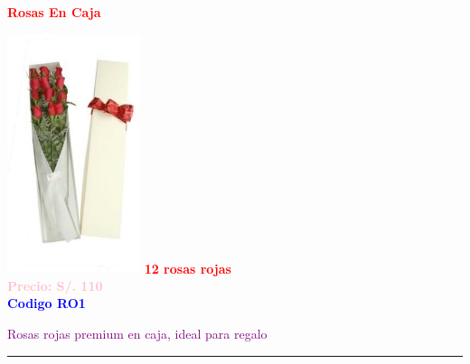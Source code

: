    \begin{center}
        \textbf{\Huge\textcolor{red}{Rosas En Caja}}
    \end{center}
    \begin{multicols}{2}

    \begin{minipage}{\linewidth}
        \centering
        \includegraphics[height=7cm]{imagenes_extraidas/image_5_3} %
        \newline
        \vspace{0.1cm}
        \textbf{\Large \textcolor{red}{12 rosas rojas}} \\ %
        \vspace{0.2cm}
        \textbf{\textcolor{pink}{Precio: S/. 110}} \\ %
        \vspace{0.2cm}
        \textbf{\textcolor{blue}{Codigo RO1}} \\ %
        \vspace{0.2cm}
        \begin{minipage}{0.8\linewidth} 
            \small \textcolor{purple}{Rosas rojas premium en caja, ideal para regalo} %
        \end{minipage}
        \vspace{0.1cm}        
        \rule{\linewidth}{0.5pt}
    \end{minipage}
    

\end{multicols}
